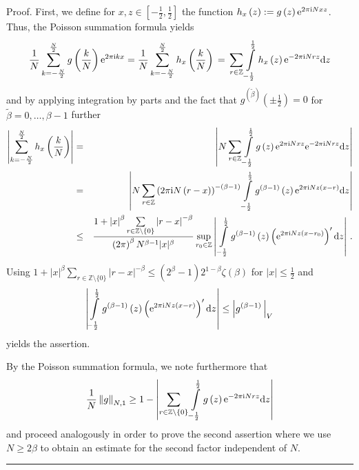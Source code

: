 \documentclass[11pt,a4paper,bibtotoc]{scrartcl}
\def\Z{\mathbb{Z}}
\def\ti{\mbox{\scriptsize{\rm i}}}
\newcommand{\eip}[1]{{\rm e}^{ 2\pi{\ti} #1}}
\newcommand{\eim}[1]{{\rm e}^{-2\pi{\ti} #1}}
\renewcommand{\d}{{\rm d}}
\renewcommand{\Box}{\hspace*{0ex} \hfill \rule{1.5ex}{1.5ex} \\ \goodbreak}
\numberwithin{equation}{section}
\numberwithin{table}{section}
\numberwithin{figure}{section}
\begin{document}
Proof. First, we define for $x,z \in \left[-\frac{1}{2},\frac{1}{2}\right]$ the
function $h_x\left(z\right):=  g\left(z\right)\eip{N x z}$.
Thus, the Poisson summation formula yields
\begin{equation*}
  \frac{1}{N}
  \sum\limits_{k=-\frac{N}{2}}^{\frac{N}{2}}
  g\left(\frac{k}{N}\right) \eip{kx} =
  \frac{1}{N}
  \sum\limits_{k=-\frac{N}{2}}^{\frac{N}{2}}
  h_x\left(\frac{k}{N}\right)\, =\, \sum_{r\in \mathbb{Z}}
  \int\limits_{-\frac{1}{2}}^{\frac{1}{2}}
  h_x\left(z\right)  \eim{N r z} \d z
\end{equation*}
and by applying integration by parts and the fact that
$g^{\left(\tilde\beta\right)}\left(\pm\frac{1}{2}\right)=0$ for $\tilde \beta=
0,\ldots,\beta-1$ further
\begin{eqnarray*}
  \left| \sum\limits_{k=-\frac{N}{2}}^{\frac{N}{2}}
  h_x\left(\frac{k}{N}\right) \right|
  &=&\left| N \sum_{r\in \mathbb{Z}}
  \int\limits_{-\frac{1}{2}}^{\frac{1}{2}} g\left(z\right) \eip{N x z}
  \eim{N r z}  \d z \right |\\
  &=&
  \left| N \sum_{r\in \mathbb{Z}} \left(2\pi {\rm i} N
      \left(r-x\right)\right)^{-\left(\beta-1\right)} 
    \int\limits_{-\frac{1}{2}}^{\frac{1}{2}}
    g^{\left(\beta-1\right)}\left(z\right)  \eip{N z \left(x - r\right)}
    \d z \right |\\
  &\le&
  \frac{1+\left|x\right|^{\beta} \sum\limits_{r\in \Z\setminus\{0\}}
    \left|r-x\right|^{-\beta}}
  {\left(2\pi\right)^{\beta} N^{\beta-1} |x|^{\beta}} \sup_{r_0\in\Z}
  \left | \, \int\limits_{-\frac{1}{2}}^{\frac{1}{2}}
    g^{\left(\beta-1\right)}\left(z\right)  \left( \eip{N z \left(x -
          r_0\right)} \right)' 
    \d z \right |\,.
\end{eqnarray*}
Using $1+\left|x\right|^{\beta} \sum_{r\in \Z\setminus\{0\}}
\left|r-x\right|^{-\beta} \le (2^{\beta}-1)2^{1-\beta}\zeta(\beta)$ for
$|x|\le\frac{1}{2}$ and
\begin{equation*}
  \left |
   \int\limits_{-\frac{1}{2}}^{\frac{1}{2}}
   g^{\left(\beta-1\right)}\left(z\right)  \left( \eip{N z \left(x - r\right)}
   \right)' \d z \right |
 \le
 \left|g^{\left(\beta-1\right)}\,\right|_V
\end{equation*}
yields the assertion.

By the Poisson summation formula, we note furthermore that
\begin{equation*}
  \frac{1}{N} \left\|g\right\|_{N,1}
  \ge 1-\left|\sum\limits_{r\in\mathbb{Z}\setminus\left\{0\right\}}
  \int\limits_{-\frac{1}{2}}^{\frac{1}{2}} g\left(z\right) \eim{Nrz}\d
  z\right|
\end{equation*}
and proceed analogously in order to prove the second assertion where we use
$N\ge 2\beta$ to obtain an estimate for the second factor independent of
$N$. \Box
\end{document}
